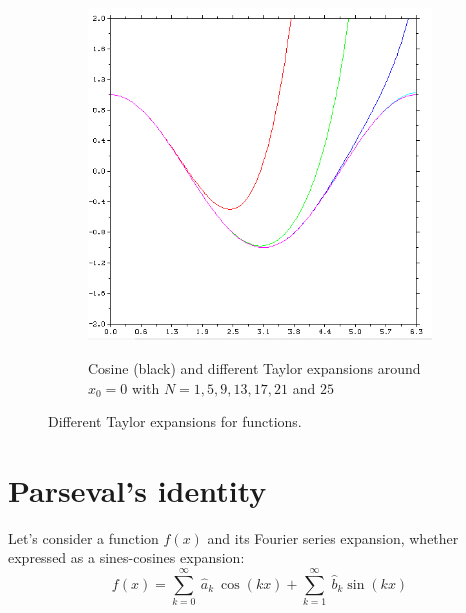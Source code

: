 \begin{figure}
    \centering
    \begin{subfigure}[h]{0.5\textwidth}
        \centering
        \includegraphics[width = \textwidth]{./doc/Figures/Taylor3.png}  \\
        \caption{Cosine (black) and different Taylor expansions around $x_0 = 0$ with $N = 1, 5, 9, 13, 17, 21$ and $25$}
        \label{fig:Taylor3}
    \end{subfigure}
    \caption{Different Taylor expansions for functions.}   \label{fig:Taylor}
\end{figure}


  
   

\section{Parseval's identity} 

Let's consider a function $f(x)$ and its Fourier series expansion, whether expressed as a sines-cosines expansion:
\begin{equation} 
	f ( x)  =  \sum_{k=0} ^{\infty} \  \hat{a}_k  \ \cos\left(k x\right)  + \sum_{k=1} ^{\infty} \  \hat{b}_k  \sin\left(k x\right)
\end{equation} 	

